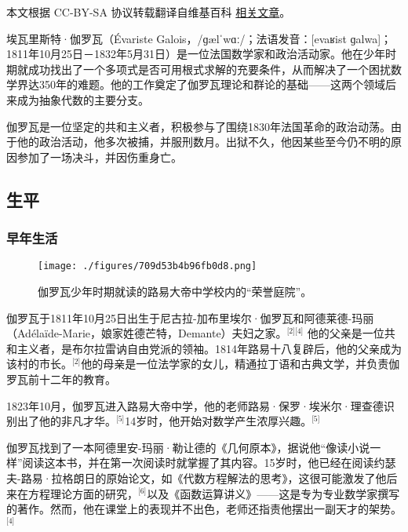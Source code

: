
本文根据 CC-BY-SA 协议转载翻译自维基百科 \href{https://en.wikipedia.org/wiki/\%C3\%89variste_Galois}{相关文章}。

埃瓦里斯特·伽罗瓦（Évariste Galois，/ɡælˈwɑː/；法语发音：[evaʁist ɡalwa]；1811年10月25日－1832年5月31日）是一位法国数学家和政治活动家。他在少年时期就成功找出了一个多项式是否可用根式求解的充要条件，从而解决了一个困扰数学界达350年的难题。他的工作奠定了伽罗瓦理论和群论的基础——这两个领域后来成为抽象代数的主要分支。

伽罗瓦是一位坚定的共和主义者，积极参与了围绕1830年法国革命的政治动荡。由于他的政治活动，他多次被捕，并服刑数月。出狱不久，他因某些至今仍不明的原因参加了一场决斗，并因伤重身亡。
\subsection{生平}
\subsubsection{早年生活}
\begin{figure}[ht]
\centering
\texttt{[image: ./figures/709d53b4b96fb0d8.png]}
\caption{伽罗瓦少年时期就读的路易大帝中学校内的“荣誉庭院”。} \label{fig_AWLS_1}
\end{figure}
伽罗瓦于1811年10月25日出生于尼古拉-加布里埃尔·伽罗瓦和阿德莱德-玛丽（Adélaïde-Marie，娘家姓德芒特，Demante）夫妇之家。\(^\text{[2][4]}\) 他的父亲是一位共和主义者，是布尔拉雷讷自由党派的领袖。1814年路易十八复辟后，他的父亲成为该村的市长。\(^\text{[2]}\)他的母亲是一位法学家的女儿，精通拉丁语和古典文学，并负责伽罗瓦前十二年的教育。

1823年10月，伽罗瓦进入路易大帝中学，他的老师路易·保罗·埃米尔·理查德识别出了他的非凡才华。\(^\text{[5]}\)14岁时，他开始对数学产生浓厚兴趣。\(^\text{[5]}\)

伽罗瓦找到了一本阿德里安-玛丽·勒让德的《几何原本》，据说他“像读小说一样”阅读这本书，并在第一次阅读时就掌握了其内容。15岁时，他已经在阅读约瑟夫-路易·拉格朗日的原始论文，如《代数方程解法的思考》，这很可能激发了他后来在方程理论方面的研究，\(^\text{[6]}\)以及《函数运算讲义》——这是专为专业数学家撰写的著作。然而，他在课堂上的表现并不出色，老师还指责他摆出一副天才的架势。\(^\text{[4]}\)
